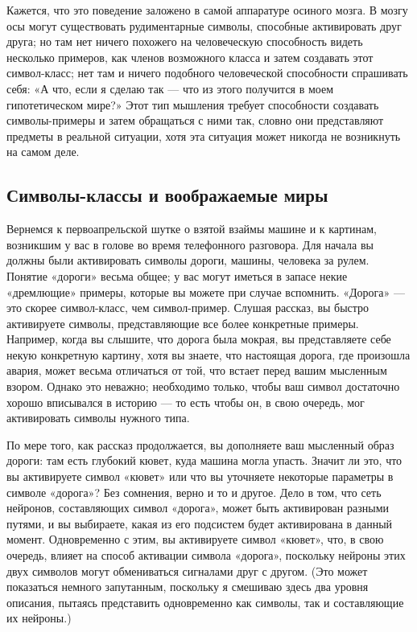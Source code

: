 \documentclass[../main.tex]{subfiles}
\begin{document}
Кажется, что это поведение заложено в самой аппаратуре осиного мозга. В мозгу осы могут существовать рудиментарные символы, способные активировать друг друга; но там нет ничего похожего на человеческую способность видеть несколько примеров, как членов возможного класса и затем создавать этот символ-класс; нет там и ничего подобного человеческой способности спрашивать себя: «А что, если я сделаю так --- что из этого получится в моем гипотетическом мире?» Этот тип мышления требует способности создавать символы-примеры и затем обращаться с ними так, словно они представляют предметы в реальной ситуации, хотя эта ситуация может никогда не возникнуть на самом деле.

\subsection{Символы-классы и воображаемые миры}

Вернемся к первоапрельской шутке о взятой взаймы машине и к картинам, возникшим у вас в голове во время телефонного разговора. Для начала вы должны были активировать символы дороги, машины, человека за рулем. Понятие «дороги» весьма общее; у вас могут иметься в запасе некие «дремлющие» примеры, которые вы можете при случае вспомнить. «Дорога» --- это скорее символ-класс, чем символ-пример. Слушая рассказ, вы быстро активируете символы, представляющие все более конкретные примеры. Например, когда вы слышите, что дорога была мокрая, вы представляете себе некую конкретную картину, хотя вы знаете, что настоящая дорога, где произошла авария, может весьма отличаться от той, что встает перед вашим мысленным взором. Однако это неважно; необходимо только, чтобы ваш символ достаточно хорошо вписывался в историю --- то есть чтобы он, в свою очередь, мог активировать символы нужного типа.

По мере того, как рассказ продолжается, вы дополняете ваш мысленный образ дороги: там есть глубокий кювет, куда машина могла упасть. Значит ли это, что вы активируете символ «кювет» или что вы уточняете некоторые параметры в символе «дорога»? Без сомнения, верно и то и другое. Дело в том, что сеть нейронов, составляющих символ «дорога», может быть активирован разными путями, и вы выбираете, какая из его подсистем будет активирована в данный момент. Одновременно с этим, вы активируете символ «кювет», что, в свою очередь, влияет на способ активации символа «дорога», поскольку нейроны этих двух символов могут обмениваться сигналами друг с другом. (Это может показаться немного запутанным, поскольку я смешиваю здесь два уровня описания, пытаясь представить одновременно как символы, так и составляющие их нейроны.)
\end{document}
